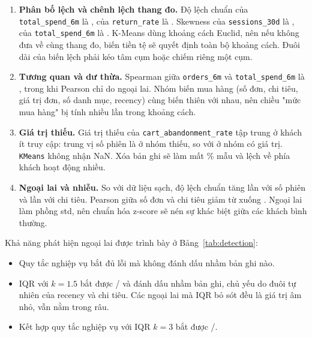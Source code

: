 \documentclass[11pt,a4paper]{article}
\begin{document}
\begin{enumerate}[label=\arabic*.]
  \item \textbf{Phân bố lệch và chênh lệch thang đo.}
  Độ lệch chuẩn của \texttt{total\_spend\_6m} là \StdSpendCorrupted, của \texttt{return\_rate} là \StdReturnCorrupted. Skewness của \texttt{sessions\_30d} là \SkewSessions, của \texttt{total\_spend\_6m} là \SkewSpend.
  K-Means dùng khoảng cách Euclid, nên nếu không đưa về cùng thang đo, biến tiền tệ sẽ quyết định toàn bộ khoảng cách. Đuôi dài của biến lệch phải kéo tâm cụm hoặc chiếm riêng một cụm.

  \item \textbf{Tương quan và dư thừa.}
  Spearman giữa \texttt{orders\_6m} và \texttt{total\_spend\_6m} là \SpearOrdersSpend, trong khi Pearson chỉ \PearOrdersSpend{} do ngoại lai. Nhóm biến mua hàng (số đơn, chi tiêu, giá trị đơn, số danh mục, recency) cùng biến thiên với nhau, nên chiều "mức mua hàng" bị tính nhiều lần trong khoảng cách.

  \item \textbf{Giá trị thiếu.}
  Giá trị thiếu của \texttt{cart\_abandonment\_rate} tập trung ở khách ít truy cập: trung vị số phiên là \CartMissSessMedian{} ở nhóm thiếu, so với \CartObsSessMedian{} ở nhóm có giá trị. \texttt{KMeans} không nhận NaN. Xóa bản ghi sẽ làm mất \MissingRecordsPct\% mẫu và lệch về phía khách hoạt động nhiều.

  \item \textbf{Ngoại lai và nhiễu.}
  So với dữ liệu sạch, độ lệch chuẩn tăng \StdRatioSessions{} lần với số phiên và \StdRatioSpend{} lần với chi tiêu. Pearson giữa số đơn và chi tiêu giảm từ \PearOrigOrdersSpend{} xuống \PearOrdersSpend. Ngoại lai làm phồng std, nên chuẩn hóa z-score sẽ nén sự khác biệt giữa các khách bình thường.
\end{enumerate}

Khả năng phát hiện \OutlierIds{} ngoại lai được trình bày ở Bảng~\ref{tab:detection}:
\begin{itemize}
  \item Quy tắc nghiệp vụ bắt đủ \OutlierError{} lỗi mà không đánh dấu nhầm bản ghi nào.
  \item IQR với $k=1.5$ bắt được \DetIqrOneTotal/\OutlierIds{} và đánh dấu nhầm \DetIqrOneFalse{} bản ghi, chủ yếu do đuôi tự nhiên của recency và chi tiêu. Các ngoại lai mà IQR bỏ sót đều là giá trị âm nhỏ, vẫn nằm trong râu.
  \item Kết hợp quy tắc nghiệp vụ với IQR $k=3$ bắt được \DetCombTotal/\OutlierIds.
\end{itemize}
\end{document}
